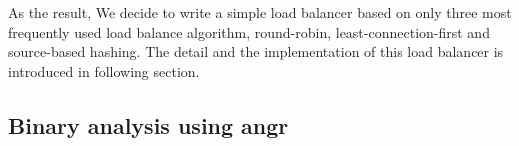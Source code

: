 As the result, We decide to write a simple load balancer based on only three
most frequently used load balance algorithm, \ca round-robin, \cb
least-connection-first and \cc source-based hashing.  The detail and the
implementation of this load balancer is introduced in following section.


\subsection{Binary analysis using angr}



